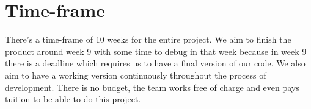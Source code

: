 \documentclass[a4paper]{article}
\begin{document}
\section{Time-frame}
There's a time-frame of 10 weeks for the entire project. We aim to finish the product around week 9 with some time to debug in that week because in week 9 there is a deadline which requires us to have a final version of our code. We also aim to have a working version continuously throughout the process of development. There is no budget, the team works free of charge and even pays tuition to be able to do this project.



\end{document}

